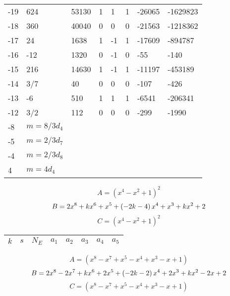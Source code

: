 \documentclass{amsart}
\begin{document}
\begin{longtable}{|l|l|l|lllll|}
-19&624&53130&1&1&1&-26065&-1629823\\
-18&360&40040&0&0&0&-21563&-1218362\\
-17&24&1638&1&-1&1&-17609&-894787\\
-16&-12&1320&0&-1&0&-55&-140\\
-15&216&14630&1&-1&1&-11197&-453189\\
-14&3/7&40&0&0&0&-107&-426\\
-13&-6&510&1&1&1&-6541&-206341\\
-12&3/2&112&0&0&0&-299&-1990\\
-8&$m=8/3d_{4}$&&\multicolumn{5}{c|}{}\\
-5&$m=2/3d_{7}$&&\multicolumn{5}{c|}{}\\
-4&$m=2/3d_{8}$&&\multicolumn{5}{c|}{}\\
4&$m=4d_{4}$&&\multicolumn{5}{c|}{}\\
\hline
\end{longtable}
$$A=(x^4
 - x^2
 + 1)^{2}$$
$$B=2\*x^8
 + k\*x^6
 + x^5
 + \left(-2\*k
 - 4\right) \*x^4
 + x^3
 + k\*x^2
 + 2$$
$$C=(x^4
 - x^2
 + 1)^{2}$$
\begin{longtable}{|l|l|l|lllll|}
\hline
$k$ & $s$ & $N_E$ & $a_1$ & $a_2$ & $a_3$ & $a_4$ & $a_5$\\
\hline
\hline
\end{longtable}
$$A=(x^8
 - x^7
 + x^5
 - x^4
 + x^3
 - x
 + 1)$$
$$B=2\*x^8
 - 2\*x^7
 + k\*x^6
 + 2\*x^5
 + \left(-2\*k
 - 2\right) \*x^4
 + 2\*x^3
 + k\*x^2
 - 2\*x
 + 2$$
$$C=(x^8
 - x^7
 + x^5
 - x^4
 + x^3
 - x
 + 1)$$
\end{document}
